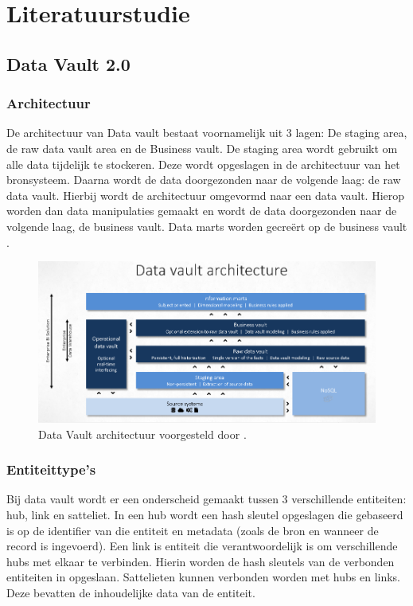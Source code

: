 \section{Literatuurstudie}
\label{sec:state-of-the-art}
\subsection{Data Vault 2.0}
\subsubsection{Architectuur}
De architectuur van Data vault bestaat voornamelijk uit 3 lagen: De staging area, de raw data vault area en de Business vault. De staging area wordt gebruikt om alle data tijdelijk te stockeren. Deze wordt opgeslagen in de architectuur van het bronsysteem. Daarna wordt de data doorgezonden naar de volgende laag: de raw data vault. Hierbij wordt de architectuur omgevormd naar een data vault. Hierop worden dan data manipulaties gemaakt en wordt de data doorgezonden naar de volgende laag, de business vault. Data marts worden gecreërt op de business vault \autocite{Linstedt2015}.

\begin{figure}[h]
	\centering
	\includegraphics[scale=0.345]{images/DVArchitectuur.png}
	\caption{Data Vault architectuur voorgesteld door \textcite{Stroobants2018}.}
	\label{fig:dvarch}
\end{figure}

\subsubsection{Entiteittype's}
Bij data vault wordt er een onderscheid gemaakt tussen 3 verschillende entiteiten: hub, link en satteliet. In een hub wordt een hash sleutel opgeslagen die gebaseerd is op de identifier van die entiteit en metadata (zoals de bron en wanneer de record is ingevoerd). Een link is entiteit die verantwoordelijk is om verschillende hubs met elkaar te verbinden. Hierin worden de hash sleutels van de verbonden entiteiten in opgeslaan. Sattelieten kunnen verbonden worden met hubs en links. Deze bevatten de inhoudelijke data van de entiteit.  


